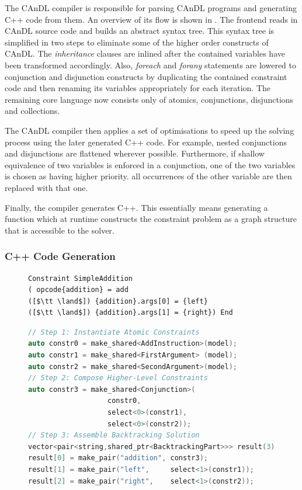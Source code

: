     The CAnDL compiler is responsible for parsing CAnDL programs and
    generating C++ code from them.
    An overview of its  flow is shown in .
    The frontend reads in  CAnDL source code and builds an abstract syntax tree.
    This syntax tree is simplified in two steps to eliminate some of the higher
    order constructs of CAnDL.
    The {\it inheritance} clauses are inlined after the contained variables
    have been transformed accordingly.
    Also, {\it foreach} and {\it forany} statements are lowered to
    conjunction and disjunction constructs by duplicating the contained
    constraint code and then renaming its variables appropriately
    for each iteration.
    The remaining core language now consists only of atomics, conjunctions,
    disjunctions and collections.

    The CAnDL compiler then applies a set of optimisations to speed up the
    solving process using the later generated C++ code.
    For example, nested conjunctions and disjunctions are flattened wherever
    possible.
    Furthermore, if shallow equivalence of two variables is enforced in a
    conjunction, one of the two variables is chosen as having higher priority.
    all occurrences of the other variable are then replaced with that one.

    Finally, the compiler generates C++.
    This essentially means generating a function which at runtime constructs
    the constraint problem as a graph structure that is accessible to the
    solver.

\subsubsection{C++ Code Generation}

\begin{figure}[t]
\centering
\begin{lstlisting}[language=CAnDL]
Constraint SimpleAddition
( opcode{addition} = add
([$\tt \land$]) {addition}.args[0] = {left}
([$\tt \land$]) {addition}.args[1] = {right}) End
\end{lstlisting}
\begin{lstlisting}[language=C++,label={fig:codegen},caption=
   {C++ code generation: The code is generated to first instantiate atomic
    constraints, then compose higher-level constructs and finally assemble a
    backtracking solution for the solver.\parfillskip=0pt}]
// Step 1: Instantiate Atomic Constraints
auto constr0 = make_shared<AddInstruction>(model);
auto constr1 = make_shared<FirstArgument> (model);
auto constr2 = make_shared<SecondArgument>(model);
// Step 2: Compose Higher-Level Constraints
auto constr3 = make_shared<Conjunction>(
                   constr0,
                   select<0>(constr1),
                   select<0>(constr2));
// Step 3: Assemble Backtracking Solution
vector<pair<string,shared_ptr<BacktrackingPart>>> result(3);
result[0] = make_pair("addition", constr3);
result[1] = make_pair("left",     select<1>(constr1));
result[2] = make_pair("right",    select<1>(constr2));
\end{lstlisting}
\end{figure}

